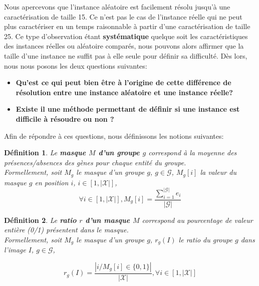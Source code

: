 \documentclass[a4paper,10pt]{article}
\newtheorem{definition}{Définition}
\begin{document}
Nous apercevons que l'instance aléatoire est facilement résolu jusqu'à une caractérisation de taille 15. Ce n'est pas le cas de l'instance réelle qui ne peut plus caractériser en un temps raisonnable à partir d'une caractérisation de taille 25. Ce type d'observation étant \textbf{systématique} quelque soit les caractéristiques des instances réelles ou aléatoire comparés, nous pouvons alors affirmer que la taille d'une instance ne suffit pas à elle seule pour définir sa difficulté. Dès lors, nous nous posons les deux questions suivantes:\\

\begin{itemize}
\item \textbf{Qu'est ce qui peut bien être à l'origine de cette différence de résolution entre une instance aléatoire et une instance réelle?}
\item \textbf{Existe il une méthode permettant de définir si une instance est difficile à résoudre ou non ?}\\
\end{itemize}
Afin de répondre à ces questions, nous définissons les notions suivantes:

\begin{definition}
Le \textbf{masque $M$ d'un groupe $g$} correspond à la moyenne des présences/absences des gènes pour chaque entité du groupe.\\
Formellement, soit $M_g$ le masque d'un groupe $g$, $g \in \mathcal{G}$, $M_g[i]$ la valeur du masque $g$ en position $i$, $i \in [1,|\mathcal{X}|]$,
$$\forall i \in  [1, |\mathcal{X}|], M_g[i]= \frac{\sum_{i=1}^{|\mathcal{G}|}e_i}{|\mathcal{G}|} $$
\end{definition}

\begin{definition}
Le \textbf{ratio $r$ d'un masque $M$} correspond au pourcentage de valeur entière (0/1) présentent dans le masque.\\
Formellement, soit $M_g$ le masque d'un groupe $g$, $r_g(I)$ le ratio du groupe $g$ dans l'image $I$, $g \in \mathcal{G}$,
\begin{center}
$$ r_g(I)=\frac{|{i / M_g[i] \in \{0,1\}}|}{|\mathcal{X}|},\forall i \in [1,|\mathcal{X}|]$$
\end{center}
\end{definition}
\end{document}
